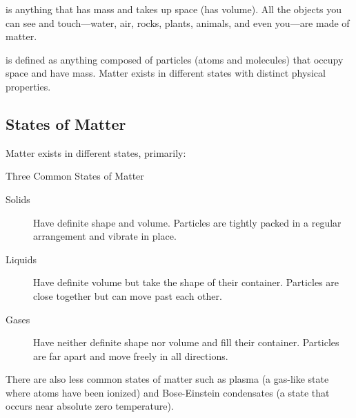  is anything that has mass and takes up space (has volume).
All the objects you can see and touch—water, air, rocks, plants, animals, and even you—are made of matter.

 is defined as anything composed of particles (atoms and molecules) that occupy space and have mass. Matter exists in different states with distinct physical properties.


\subsection{States of Matter}

Matter exists in different states, primarily:

\begin{keyconcept}{Three Common States of Matter}
\begin{description}
    \item[Solids] Have definite shape and volume. Particles are tightly packed in a regular arrangement and vibrate in place.
    
    \item[Liquids] Have definite volume but take the shape of their container. Particles are close together but can move past each other.
    
    \item[Gases] Have neither definite shape nor volume and fill their container. Particles are far apart and move freely in all directions.
\end{description}
\end{keyconcept}


There are also less common states of matter such as plasma (a gas-like state where atoms have been ionized) and Bose-Einstein condensates (a state that occurs near absolute zero temperature).

